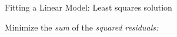 \documentclass[xcolor=x11names,compress]{beamer}
\renewcommand{\(}{\begin{columns}}
\renewcommand{\)}{\end{columns}}
\newcommand{\<}[1]{\begin{column}{#1}}
\renewcommand{\>}{\end{column}}
\begin{document}
\begin{frame}{Fitting a Linear Model: Least squares solution}

Minimize the {\it sum} of the {\it squared} {\it residuals:}

\begin{columns}[T]
\column{\textwidth}

\end{columns}
\end{frame}
\end{document}

